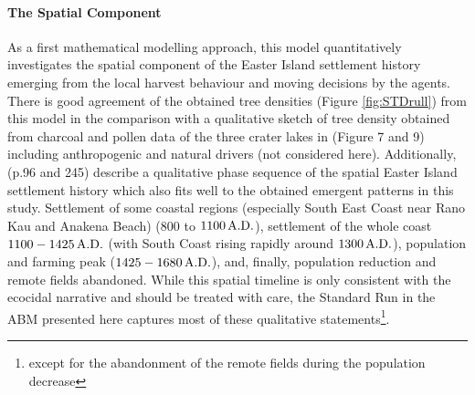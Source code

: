 \paragraph{The Spatial Component}
As a first mathematical modelling approach, this model quantitatively investigates the spatial component of the Easter Island settlement history emerging from the local harvest behaviour and moving decisions by the agents.
There is good agreement of the obtained tree densities (Figure \ref{fig:STDrull}) from this model in the comparison with a qualitative sketch of tree density obtained from charcoal and pollen data of the three crater lakes in \citet{Rull2020} (Figure 7 and 9) including anthropogenic and natural drivers (not considered here).
Additionally, \citet{Bahn2017} (p.96 and 245) describe a qualitative phase sequence of the spatial Easter Island settlement history which also fits well to the obtained emergent patterns in this study.
Settlement of some coastal regions (especially South East Coast near Rano Kau and Anakena Beach) ($800$ to $1100\, {\rm A.D.}$), settlement of the whole coast $1100-1425\,{\rm A.D.}$ (with South Coast rising rapidly around $1300\, {\rm A.D.}$), population and farming peak ($1425-1680\, {\rm A.D.}$), and, finally, population reduction and remote fields abandoned.
While this spatial timeline is only consistent with the ecocidal narrative and should be treated with care, the Standard Run in the ABM presented here captures most of these qualitative statements\footnote{except for the abandonment of the remote fields during the population decrease}.




 
